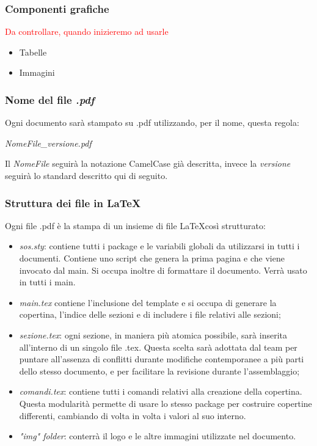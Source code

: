 	\subsubsection{Componenti grafiche}
	\textcolor{red}{Da controllare, quando inizieremo ad usarle}
	\begin{itemize}
		\item Tabelle
		\item Immagini
	\end{itemize}
	\subsubsection{Nome del file \emph{.pdf}}
	Ogni documento sarà stampato su .pdf utilizzando, per il nome, questa regola:
	\begin{center}
		\emph{NomeFile\_versione.pdf}
	\end{center}
	Il \emph{NomeFile} seguirà la notazione CamelCase già descritta, invece la \emph{versione} seguirà lo standard descritto qui di seguito.
	
	\subsubsection{Struttura dei file in \LaTeX}
	Ogni file .pdf è la stampa di un insieme di file \LaTeX così strutturato:
	\begin{itemize}
		\item \emph{sos.sty}: contiene tutti i package e le variabili globali da utilizzarsi in tutti i documenti. Contiene uno script che genera la prima pagina e che viene invocato dal main. Si occupa inoltre di formattare il documento. Verrà usato in tutti i main.
		\item \emph{main.tex} contiene l'inclusione del template e si occupa di generare la copertina, l'indice delle sezioni e di includere i file relativi alle sezioni;
		\item \emph{sezione.tex}: ogni sezione, in maniera più atomica possibile, sarà inserita all'interno di un singolo file .tex. Questa scelta sarà adottata dal team per puntare all'assenza di conflitti durante modifiche contemporanee a più parti dello stesso documento, e per facilitare la revisione durante l'assemblaggio;
		\item \emph{comandi.tex}: contiene tutti i comandi relativi alla creazione della copertina. Questa modularità permette di usare lo stesso package per costruire copertine differenti, cambiando di volta in volta i valori al suo interno.
		\item \emph{"img" folder}: conterrà il logo e le altre immagini utilizzate nel documento.
	\end{itemize}
	
